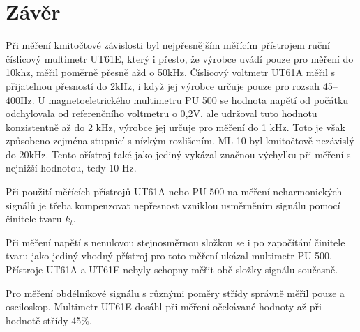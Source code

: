 \documentclass[a4paper, czech]{article}
\begin{document}
\section{Závěr}

Při měření kmitočtové závislosti byl nejpřesnějším měřícím přístrojem ruční číslicový multimetr UT61E, který i přesto, že výrobce uvádí pouze pro měření do 10khz, měřil poměrně přesně ažd o 50kHz.
Číslicový voltmetr UT61A měřil s přijatelnou přesností do 2kHz, i když jej výrobce určuje pouze pro rozsah 45–400Hz.
U magnetoeletrického multimetru PU 500 se hodnota napětí od počátku odchylovala od referenčního voltmetru o 0,2V, ale udržoval tuto hodnotu konzistentně až do 2 kHz, výrobce jej určuje pro měření do 1 kHz.
Toto je však způsobeno zejména stupnicí s nízkým rozlišením.
ML 10 byl kmitočtově nezávislý do 20kHz.
Tento ořístroj také jako jediný vykázal značnou výchylku při měření s nejnižší hodnotou, tedy 10 Hz.

Při použití měŕících přístrojů UT61A nebo PU 500 na měření neharmonických signálů je třeba kompenzovat nepřesnost vzniklou usměrněním signálu pomocí činitele tvaru $k_t$.

Při měření napětí s nenulovou stejnosměrnou složkou se i po započítání činitele tvaru jako jediný vhodný přístroj pro toto měření ukázal multimetr PU 500. Přístroje UT61A a UT61E nebyly schopny měřit obě složky signálu současně.

Pro měření obdélníkové signálu s různými poměry střídy správně měřil pouze a osciloskop.
Multimetr UT61E dosáhl při měření očekávané hodnoty až při hodnotě střídy 45\%.
\end{document}
